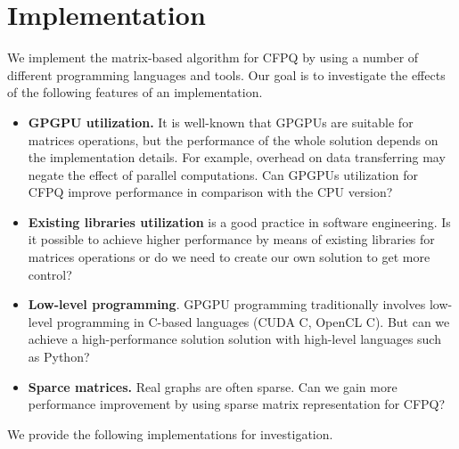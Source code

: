 \section{Implementation}

We implement the matrix-based algorithm for CFPQ by using a number of different programming languages and tools.
Our goal is to investigate the effects of the following features of an implementation.
\begin{itemize}
\item \textbf{GPGPU utilization.}
It is well-known that GPGPUs are suitable for matrices operations, but the performance of the whole solution depends on the implementation details. For example, overhead on data transferring may negate the effect of parallel computations.
Can GPGPUs utilization for CFPQ improve performance in comparison with the CPU version?

\item \textbf{Existing libraries utilization} is a good practice in software engineering.
Is it possible to achieve higher performance by means of existing libraries for matrices operations or do we need to create our own solution to get more control?

\item \textbf{Low-level programming}.
GPGPU programming traditionally involves low-level programming in C-based languages (CUDA C, OpenCL C).
But can we achieve a high-performance solution solution with high-level languages such as Python?

\item \textbf{Sparce matrices.} Real graphs are often sparse.
Can we gain more performance improvement by using sparse matrix representation for CFPQ?

\end{itemize}

We provide the following implementations for investigation.

